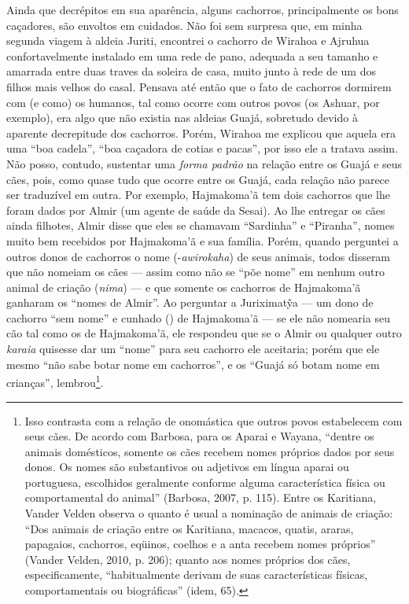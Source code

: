 Ainda que decrépitos em sua aparência, alguns cachorros, principalmente
os bons caçadores, são envoltos em cuidados. Não foi sem surpresa que,
em minha segunda viagem à aldeia Juriti, encontrei o cachorro de Wirahoa
e Ajruhua confortavelmente instalado em uma rede de pano, adequada a seu
tamanho e amarrada entre duas traves da soleira de casa, muito junto à
rede de um dos filhos mais velhos do casal. Pensava até então que o fato
de cachorros dormirem com (e como) os humanos, tal como ocorre com
outros povos (os Ashuar, por exemplo), era algo que não existia nas
aldeias Guajá, sobretudo devido à aparente decrepitude dos cachorros.
Porém, Wirahoa me explicou que aquela era uma ``boa cadela'', ``boa
caçadora de cotias e pacas'', por isso ele a tratava assim. Não posso,
contudo, sustentar uma \emph{forma padrão} na relação entre os Guajá e
seus cães, pois, como quase tudo que ocorre entre os Guajá, cada relação
não parece ser traduzível em outra. Por exemplo, Hajmakoma'ã tem dois
cachorros que lhe foram dados por Almir (um agente de saúde da Sesai).
Ao lhe entregar os cães ainda filhotes, Almir disse que eles se chamavam
``Sardinha'' e ``Piranha'', nomes muito bem recebidos por Hajmakoma'ã e sua
família. Porém, quando perguntei a outros donos de cachorros o nome
(-\emph{awirokaha}) de seus animais, todos disseram que não nomeiam os
cães --- assim como não se ``põe nome'' em nenhum outro animal de criação
(\emph{nima}) --- e que somente os cachorros de Hajmakoma'ã ganharam os
``nomes de Almir''. Ao perguntar a Juriximatỹa --- um dono de cachorro ``sem
nome'' e cunhado () de Hajmakoma'ã --- se ele não nomearia seu cão tal
como os de Hajmakoma'ã, ele respondeu que se o Almir ou qualquer outro
\emph{karaia} quisesse dar um ``nome'' para seu cachorro ele aceitaria;
porém que ele mesmo ``não sabe botar nome em cachorros'', e os ``Guajá só
botam nome em crianças'', lembrou\footnote{Isso contrasta com a relação
  de onomástica que outros povos estabelecem com seus cães. De acordo
  com Barbosa, para os Aparai e Wayana, ``dentre os animais domésticos,
  somente os cães recebem nomes próprios dados por seus donos. Os nomes
  são substantivos ou adjetivos em língua aparai ou portuguesa,
  escolhidos geralmente conforme alguma característica física ou
  comportamental do animal'' (Barbosa, 2007, p. 115). Entre os Karitiana,
  Vander Velden observa o quanto é usual a nominação de animais de
  criação: ``Dos animais de criação entre os Karitiana, macacos, quatis,
  araras, papagaios, cachorros, eqüinos, coelhos e a anta recebem nomes
  próprios'' (Vander Velden, 2010, p. 206); quanto aos nomes próprios dos
  cães, especificamente, ``habitualmente derivam de suas características
  físicas, comportamentais ou biográficas'' (idem, 65).}.

